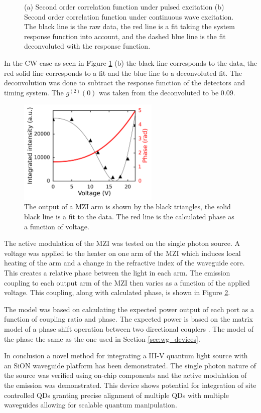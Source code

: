 \begin{figure}[h!]
\begin{subfigure}{0.49\textwidth}
\end{subfigure} \caption{(a) Second order correlation function under pulsed
excitation (b) Second order correlation function under continuous wave
excitation. The black line is the raw data, the red line is a fit taking the
system response function into account, and the dashed blue line is the fit
deconvoluted with the response function.} \label{fig:g2s} \end{figure}

In the CW case as seen in Figure \ref{fig:g2s} (b) the black line corresponds to
the data, the red solid line corresponds to a fit and the blue line to a
deconvoluted fit. The deconvolution was done to subtract the response function
of the detectors and timing system. The $g^{(2)}(0)$ was taken from the
deconvoluted to be 0.09.

\begin{figure}[h!] \centering
\includegraphics[width=0.6\textwidth]{images/dj_oneport.png} \caption{
The output of a MZI arm is shown by the black triangles, the solid black line is a
fit to the data. The red line is the calculated phase as a function of voltage.
}
\label{fig:modul} \end{figure}

The active modulation of the MZI was tested on the single photon source. A
voltage was applied to the heater on one arm of the MZI which induces local
heating of the arm and a change in the refractive index of the waveguide core.
This creates a relative phase between the light in each arm. The emission
coupling to each output arm of the MZI then varies as a function of the applied
voltage. This coupling, along with calculated phase, is shown in Figure
\ref{fig:modul}.

The model was based on calculating the expected power output of each port as a
function of coupling ratio and phase. The expected power is based on the matrix
model of a phase shift operation between two directional couplers
\cite{jones1941new}. The model of the phase the same as the one used in Section
\ref{sec:wg_devices}\cite{matthews2009manipulation}.

In conclusion a novel method for integrating a III-V quantum light source with
an SiON waveguide platform has been demonstrated. The single photon nature of
the source was verified using on-chip components and the active modulation of
the emission was demonstrated. This device shows potential for integration of
site controlled \cite{juska2013towards} QDs granting precise alignment of
multiple QDs with multiple waveguides allowing for scalable quantum
manipulation.
